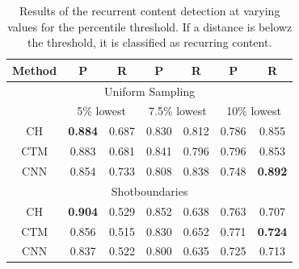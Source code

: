 \documentclass{report}
\begin{document}
\begin{table}[H]
	\begin{center}
		\begin{tabular}{ c c c c c c c} 
			\hline
			\textbf{Method} & \textbf{P} & \textbf{R} & \textbf{P} & \textbf{R} & \textbf{P} & \textbf{R} \\
			\hline
			\multicolumn{7}{c}{Uniform Sampling} \\
			 & \multicolumn{2}{c}{5\% lowest} & \multicolumn{2}{c}{7.5\% lowest} & \multicolumn{2}{c}{10\% lowest} \\
			\hline	
			CH 				& \textbf{0.884} 	& 0.687		& 0.830 	& 0.812 	& 0.786	 	& 0.855 \\
			CTM 			& 0.883 	& 0.681 		& 0.841 	& 0.796 & 0.796 	& 0.853 \\
			CNN 			& 0.854		& 0.733			& 0.808		& 0.838 & 0.748		& \textbf{0.892} \\
			\hline
			\multicolumn{7}{c}{Shotboundaries} \\
			\hline
			CH	 			& \textbf{0.904}		& 0.529 		& 0.852  	& 0.638 & 0.763	 	& 0.707 \\
			CTM 			& 0.856 	& 0.515 		& 0.830 	& 0.652 & 0.771		& \textbf{0.724} \\
			CNN 			& 0.837		& 0.522			& 0.800		& 0.635 & 0.725		& 0.713  \\
			\hline
		\end{tabular}
	\end{center}
	\caption{Results of the recurrent content detection at varying values for the percentile threshold. If a distance is belowz the threshold, it is classified as recurring content.}
	\label{table:resultsrecurring}
\end{table}
\end{document}
